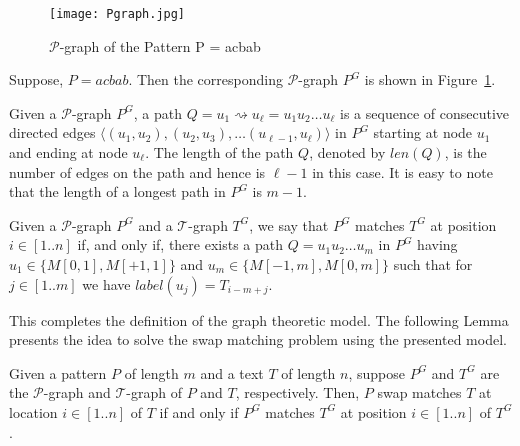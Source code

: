 \documentclass{llncs}
\begin{document}
\begin{figure}[hbtp]
\begin{center}
\texttt{[image: Pgraph.jpg]}
\caption{$\mathcal P$-graph of the Pattern P = acbab} \label{Fig_P_Graph1}
\end{center}
\end{figure}



\begin{example}\label{Ex_P_Graph}
Suppose, $P = acbab$. Then the corresponding $\mathcal P$-graph
$P^G$ is shown in Figure~\ref{Fig_P_Graph1}.
\end{example}




\begin{definition}


Given a $\mathcal P$-graph $P^G$, a path $Q = u_1\rightsquigarrow
u_\ell = u_1 u_2 \ldots u_\ell $ is a sequence of consecutive
directed edges $\langle(u_1,u_2),(u_2,u_3),\dots(u_{\ell-1},u_\ell)
\rangle$ in $P^G$ starting at node $u_1$ and ending at node
$u_\ell$. The length of the path $Q$, denoted by $len(Q)$, is the
number of edges on the path and hence is $\ell -1$ in this case. It
is easy to note that the length of a longest path in $P^G$ is $m-1$.
\end{definition}

\begin{definition}


Given a $\mathcal P$-graph $P^G$ and a $\mathcal T$-graph $T^G$, we
say that $P^G$ matches $T^G$ at position $i\in[1..n]$ if, and only if,
there exists a path $Q = u_1 u_2 \ldots u_m$ in $P^G$ having
$u_1\in\{M[0,1], M[+1,1]\}$ and $u_m\in\{M[-1,m], M[0,m]\}$ such that
for $j\in[1..m]$ we have $label(u_j) = T_{i-m+j}$.
\end{definition}



This completes the definition of the graph theoretic model. The following Lemma presents the idea to solve the swap matching problem using the presented model.


\begin{lemma}Given a pattern $P$ of length $m$ and a text $T$ of length $n$,
suppose $P^G$ and $T^G$ are the $\mathcal P$-graph and $\mathcal
T$-graph of $P$ and $T$, respectively. Then, $P$ swap matches $T$ at
location $i\in [1..n]$ of $T$ if and only if $P^G$ matches $T^G$ at
position $i\in [1..n]$ of $T^G$.
\end{lemma}
\end{document}

